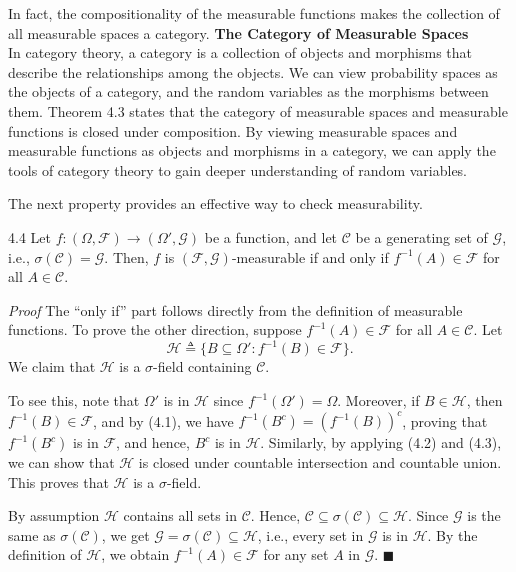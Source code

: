In fact, the compositionality of the measurable functions makes the collection of all measurable spaces a category.
\textbf{The Category of Measurable Spaces} \\
In category theory, a category is a collection of objects and morphisms that describe the relationships among the objects. We can view probability spaces as the objects of a category, and the random variables as the morphisms between them. Theorem 4.3 states that the category of measurable spaces and measurable functions is closed under composition. By viewing measurable spaces and measurable functions as objects and morphisms in a category, we can apply the tools of category theory to gain deeper understanding of random variables.

The next property provides an effective way to check measurability.

\begin{thmbox}{4.4}
Let $f : (\Omega, \mathcal{F}) \to (\Omega', \mathcal{G})$ be a function, and let $\mathcal{C}$ be a generating set of $\mathcal{G}$, i.e., $\sigma(\mathcal{C}) = \mathcal{G}$. Then, $f$ is $(\mathcal{F}, \mathcal{G})$-measurable if and only if $f^{-1}(A) \in \mathcal{F}$ for all $A \in \mathcal{C}$.
\end{thmbox}

\noindent\textit{Proof} The ``only if'' part follows directly from the definition of measurable functions. To prove the other direction, suppose $f^{-1}(A) \in \mathcal{F}$ for all $A \in \mathcal{C}$. Let
\[
\mathcal{H} \triangleq \{B \subseteq \Omega' : f^{-1}(B) \in \mathcal{F}\}.
\]
We claim that $\mathcal{H}$ is a $\sigma$-field containing $\mathcal{C}$.

To see this, note that $\Omega'$ is in $\mathcal{H}$ since $f^{-1}(\Omega') = \Omega$. Moreover, if $B \in \mathcal{H}$, then $f^{-1}(B) \in \mathcal{F}$, and by (4.1), we have $f^{-1}(B^c) = (f^{-1}(B))^c$, proving that $f^{-1}(B^c)$ is in $\mathcal{F}$, and hence, $B^c$ is in $\mathcal{H}$. Similarly, by applying (4.2) and (4.3), we can show that $\mathcal{H}$ is closed under countable intersection and countable union. This proves that $\mathcal{H}$ is a $\sigma$-field.

By assumption $\mathcal{H}$ contains all sets in $\mathcal{C}$. Hence, $\mathcal{C} \subseteq \sigma(\mathcal{C}) \subseteq \mathcal{H}$. Since $\mathcal{G}$ is the same as $\sigma(\mathcal{C})$, we get $\mathcal{G} = \sigma(\mathcal{C}) \subseteq \mathcal{H}$, i.e., every set in $\mathcal{G}$ is in $\mathcal{H}$. By the definition of $\mathcal{H}$, we obtain $f^{-1}(A) \in \mathcal{F}$ for any set $A$ in $\mathcal{G}$. \hfill $\blacksquare$

